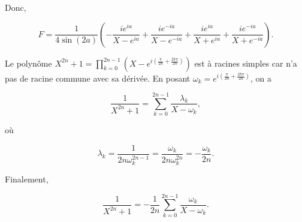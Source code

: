 {{\begin{itemize}
Donc,

$$F=\frac{1}{4\sin(2a)}(-\frac{ie^{ia}}{X-e^{ia}}+\frac{ie^{-ia}}{X-e^{-ia}}+\frac{ie^{ia}}{X+e^{ia}}+\frac{ie^{-ia}}{X+e^{-ia}}).$$

\end{itemize}
Le polynôme $X^{2n}+1=\prod_{k=0}^{2n-1}(X-e^{i(\frac{\pi}{2n}+\frac{2k\pi}{2n})})$ est à racines simples car n'a pas de racine commune avec sa dérivée. En posant $\omega_k=e^{i(\frac{\pi}{2n}+\frac{2k\pi}{2n})}$, on a

$$\frac{1}{X^{2n}+1}=\sum_{k=0}^{2n-1}\frac{\lambda_k}{X-\omega_k},$$

où 

$$\lambda_k=\frac{1}{2n\omega_k^{2n-1}}=\frac{\omega_k}{2n\omega_k^{2n}}=-\frac{\omega_k}{2n}.$$

Finalement,

$$\frac{1}{X^{2n}+1}=-\frac{1}{2n}\sum_{k=0}^{2n-1}\frac{\omega_k}{X-\omega_k}.$$
}
}
